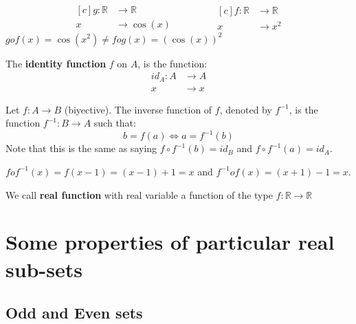 \documentclass[12pt, a4paper]{book}
\begin{document}
\begin{exmp}
  \begin{equation*}
    \begin{aligned}[c]
      g:\mathbb{R} &\longrightarrow \mathbb{R} \\
      x &\longrightarrow \cos (x)
    \end{aligned}
    \qquad \qquad
    \begin{aligned}[c]
      f:\mathbb{R} &\longrightarrow \mathbb{R} \\
      x &\longrightarrow x^2
    \end{aligned}
  \end{equation*}
  $g o f(x) = \cos (x^2) \neq f o g(x) = {(\cos(x))}^2$
\end{exmp}

\begin{defn}
  \boldmath
  The \textbf{identity function} $f$ on $A$, is the function:
  \begin{align*}
    {id}_A:A &\longrightarrow A \\
    x &\longrightarrow x
  \end{align*}
  \unboldmath
\end{defn}

\begin{defn}
  \boldmath
  Let $f:A\longrightarrow B$ (biyective). The inverse function of $f$, denoted by $f^{-1}$, is the function $f^{-1}:B \longrightarrow A$ such that:
  \[
    b = f(a) \Leftrightarrow a = f^{-1}(b)
  \]
  Note that this is the same as saying $f \circ f^{-1}(b) = {id}_B$ and $f \circ f^{-1}(a) = {id}_A$.
  \unboldmath
\end{defn}

\begin{exmp}
  $f o f^{-1}(x) = f(x-1) = (x-1)+1 = x$ and $f^{-1} o f(x) = (x+1)-1 = x$.
\end{exmp}

\begin{defn}
  We call \textbf{real function} with real variable a function of the type $f:\mathbb{R} \longrightarrow \mathbb{R}$
\end{defn}

\section{Some properties of particular real sub-sets}

\subsection{Odd and Even sets}
\end{document}
